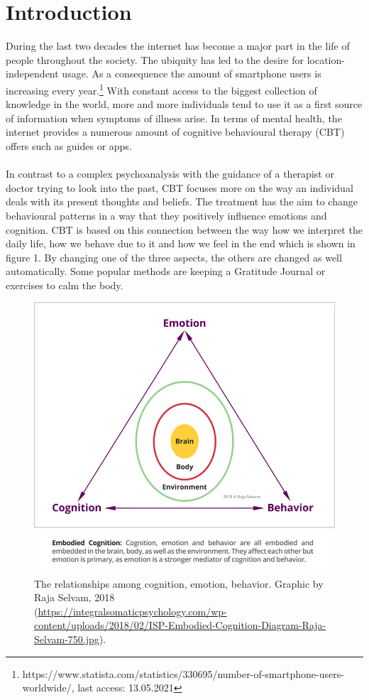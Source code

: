 \documentclass[sigconf, nonacm]{acmart}
\begin{document}
\section{Introduction}
During the last two decades the internet has become a major part in the life
of people throughout the society. The ubiquity has led to the desire for 
location-independent usage. As a consequence the amount of
smartphone users is increasing every year.\footnote{https://www.statista.com/statistics/330695/number-of-smartphone-users-worldwide/, last access: 13.05.2021}
With constant access to the biggest collection of knowledge in the world,
more and more individuals tend to use it as a first source of information when
symptoms of illness arise\cite{Wyatt2015}. 
In terms of mental health, the internet provides a numerous amount of cognitive behavioural therapy (CBT) offers such as guides
or apps. 
\\\\
In contrast to a complex psychoanalysis with the guidance of a therapist or doctor trying to look into the past,
CBT focuses more on the way an individual deals with its present thoughts and beliefs. The treatment has the aim to
change behavioural patterns in a way that they positively influence emotions and cognition. CBT is based on this connection
between the way how we interpret the daily life, how we behave due to it and how we 
feel in the end which is shown in figure 1. By changing one of the three aspects,
the others are changed as well automatically. Some popular methods are keeping a Gratitude Journal or exercises to calm the body.\cite{Spangler2002}
\begin{figure}[h]
  \centering
  \includegraphics[width=\linewidth]{cbt_picture}
  \caption{The relationships among cognition, emotion, behavior. Graphic by Raja Selvam, 2018
    \\(\url{https://integralsomaticpsychology.com/wp-content/uploads/2018/02/ISP-Embodied-Cognition-Diagram-Raja-Selvam-750.jpg}).}
\end{figure}
\end{document}
